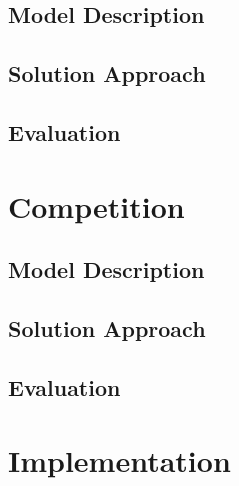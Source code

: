 \subsection{Model Description}
\subsection{Solution Approach}
\subsection{Evaluation}

\section{Competition}
\subsection{Model Description}
\subsection{Solution Approach}
\subsection{Evaluation}

\section{Implementation}
